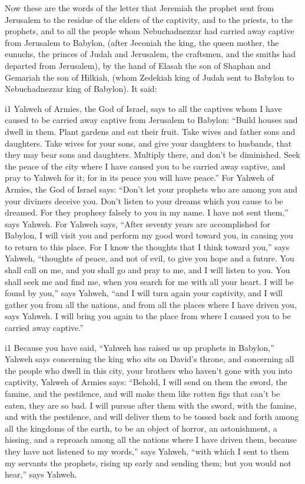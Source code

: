  Now these are the words of the letter that Jeremiah the
prophet sent from Jerusalem to the residue of the elders of the
captivity, and to the priests, to the prophets, and to all the people
whom Nebuchadnezzar had carried away captive from Jerusalem to Babylon,
 (after Jeconiah the king, the queen mother, the eunuchs,
the princes of Judah and Jerusalem, the craftsmen, and the smiths had
departed from Jerusalem),  by the hand of Elasah the son of
Shaphan and Gemariah the son of Hilkiah, (whom Zedekiah king of Judah
sent to Babylon to Nebuchadnezzar king of Babylon). It said:

i1 Yahweh of Armies, the God of Israel, says to all the
captives whom I have caused to be carried away captive from Jerusalem to
Babylon:  ``Build houses and dwell in them. Plant gardens
and eat their fruit.  Take wives and father sons and
daughters. Take wives for your sons, and give your daughters to
husbands, that they may bear sons and daughters. Multiply there, and
don't be diminished.  Seek the peace of the city where I
have caused you to be carried away captive, and pray to Yahweh for it;
for in its peace you will have peace.''  For Yahweh of
Armies, the God of Israel says: ``Don't let your prophets who are among
you and your diviners deceive you. Don't listen to your dreams which you
cause to be dreamed.  For they prophesy falsely to you in my
name. I have not sent them,'' says Yahweh.  For Yahweh
says, ``After seventy years are accomplished for Babylon, I will visit
you and perform my good word toward you, in causing you to return to
this place.  For I know the thoughts that I think toward
you,'' says Yahweh, ``thoughts of peace, and not of evil, to give you
hope and a future.  You shall call on me, and you shall go
and pray to me, and I will listen to you.  You shall seek
me and find me, when you search for me with all your heart.
 I will be found by you,'' says Yahweh, ``and I will turn
again your captivity, and I will gather you from all the nations, and
from all the places where I have driven you, says Yahweh. I will bring
you again to the place from where I caused you to be carried away
captive.''

i1 Because you have said, ``Yahweh has raised us up
prophets in Babylon,''  Yahweh says concerning the king who
sits on David's throne, and concerning all the people who dwell in this
city, your brothers who haven't gone with you into captivity,
 Yahweh of Armies says: ``Behold, I will send on them the
sword, the famine, and the pestilence, and will make them like rotten
figs that can't be eaten, they are so bad.  I will pursue
after them with the sword, with the famine, and with the pestilence, and
will deliver them to be tossed back and forth among all the kingdoms of
the earth, to be an object of horror, an astonishment, a hissing, and a
reproach among all the nations where I have driven them, 
because they have not listened to my words,'' says Yahweh, ``with which
I sent to them my servants the prophets, rising up early and sending
them; but you would not hear,'' says Yahweh.

